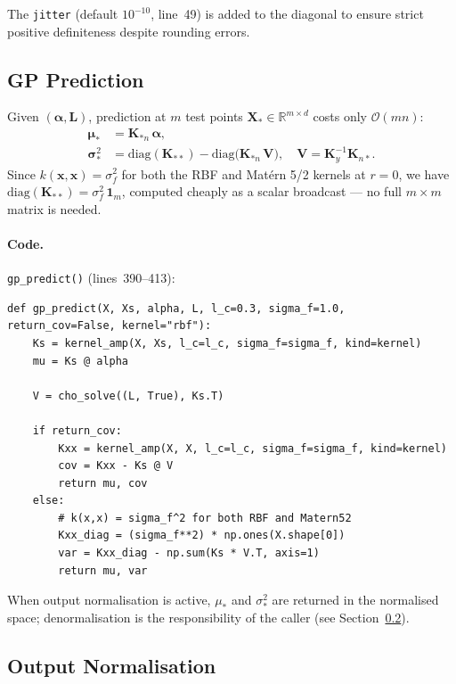 \documentclass[11pt,a4paper]{article}
\newcommand{\bx}{\bm{x}}
\newcommand{\bX}{\bm{X}}
\newcommand{\bL}{\bm{L}}
\newcommand{\balpha}{\bm{\alpha}}
\newcommand{\R}{\mathbb{R}}
\newcommand{\diag}{\mathrm{diag}}
\theoremstyle{remark}
\newcommand{\codefile}[1]{\texttt{#1}}
\newcommand{\codeline}[1]{line~#1}
\newcommand{\coderange}[2]{lines~#1--#2}
\newcommand{\codefn}[1]{\texttt{#1()}}
\begin{document}
The \texttt{jitter} (default $10^{-10}$, \codeline{49}) is added to the
diagonal to ensure strict positive definiteness despite rounding errors.

\subsection{GP Prediction}
\label{sec:predict}

Given $(\balpha, \bL)$, prediction at $m$ test points $\bX_*\in\R^{m\times d}$
costs only $\mathcal{O}(mn)$:
\begin{align}
  \bm{\mu}_*   &= \bm{K}_{*n}\,\balpha, \\
  \bm{\sigma}_*^2 &= \diag(\bm{K}_{**}) - \diag\!\bigl(\bm{K}_{*n}\,\bm{V}\bigr),
  \quad \bm{V} = \bm{K}_y^{-1}\bm{K}_{n*}.
\end{align}
Since $k(\bx,\bx) = \sigma_f^2$ for both the RBF and Mat\'{e}rn 5/2 kernels
at $r=0$, we have $\diag(\bm{K}_{**}) = \sigma_f^2\,\bm{1}_m$, computed
cheaply as a scalar broadcast --- no full $m\times m$ matrix is needed.

\paragraph{Code.}
\codefn{gp\_predict} (\coderange{390}{413}):

\begin{lstlisting}[firstnumber=390, caption=\codefn{gp\_predict} in \codefile{BO\_ML4F.py}]
def gp_predict(X, Xs, alpha, L, l_c=0.3, sigma_f=1.0, return_cov=False, kernel="rbf"):
    Ks = kernel_amp(X, Xs, l_c=l_c, sigma_f=sigma_f, kind=kernel)
    mu = Ks @ alpha

    V = cho_solve((L, True), Ks.T)

    if return_cov:
        Kxx = kernel_amp(X, X, l_c=l_c, sigma_f=sigma_f, kind=kernel)
        cov = Kxx - Ks @ V
        return mu, cov
    else:
        # k(x,x) = sigma_f^2 for both RBF and Matern52
        Kxx_diag = (sigma_f**2) * np.ones(X.shape[0])
        var = Kxx_diag - np.sum(Ks * V.T, axis=1)
        return mu, var
\end{lstlisting}

When output normalisation is active, $\mu_*$ and $\sigma_*^2$ are returned
in the normalised space; denormalisation is the responsibility of the caller
(see Section~\ref{sec:normalisation}).

\subsection{Output Normalisation}
\label{sec:normalisation}
\end{document}
